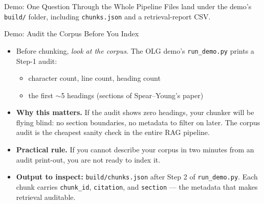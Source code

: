 \begin{frame}[fragile]{Demo: One Question Through the Whole Pipeline}
\vspace{0.02cm}
{\scriptsize Files land under the demo's \texttt{build/} folder, including \texttt{chunks.json} and a retrieval-report CSV.}
\end{frame}

\begin{frame}{Demo: Audit the Corpus Before You Index}
\begin{itemize}
\item Before chunking, \emph{look at the corpus}. The OLG demo's \texttt{run\_demo.py} prints a Step-1 audit:
\begin{itemize}\small
    \item character count, line count, heading count
    \item the first $\sim$5 headings (sections of Spear--Young's paper)
\end{itemize}

\medskip
\item \textbf{Why this matters.} If the audit shows zero headings, your chunker will be flying blind: no section boundaries, no metadata to filter on later. The corpus audit is the cheapest sanity check in the entire RAG pipeline.

\medskip
\item \textbf{Practical rule.} If you cannot describe your corpus in two minutes from an audit print-out, you are not ready to index it.

\medskip
\item \textbf{Output to inspect:} \texttt{build/chunks.json} after Step 2 of \texttt{run\_demo.py}. Each chunk carries \texttt{chunk\_id}, \texttt{citation}, and \texttt{section} --- the metadata that makes retrieval auditable.
\end{itemize}
\end{frame}

